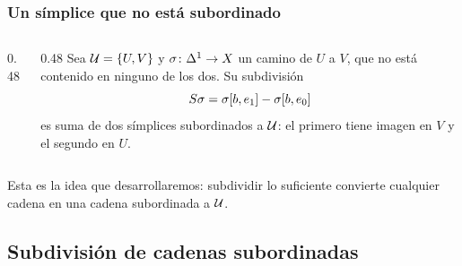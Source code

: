 \begin{frame}
  \frametitle{Un símplice que no está subordinado}

  \begin{columns}[c]
    \begin{column}{0.48\textwidth}
      \centering
    \end{column}
    \begin{column}{0.48\textwidth}
      Sea $\mathcal{U}=\{U,V\}$ y $\sigma\colon\Delta^{1}\to X$ un camino de $U$ a
      $V$, que no está contenido en ninguno de los dos. Su subdivisión
      \[
        S\sigma=\sigma[b,e_1]-\sigma[b,e_0]
      \]
      es suma de dos símplices subordinados a $\mathcal{U}$: el primero tiene imagen
      en $V$ y el segundo en $U$.
    \end{column}
  \end{columns}

  \medskip

  Esta es la idea que desarrollaremos: subdividir lo suficiente convierte
  cualquier cadena en una cadena subordinada a $\mathcal{U}$.
\end{frame}

\subsection{Subdivisión de cadenas subordinadas}

